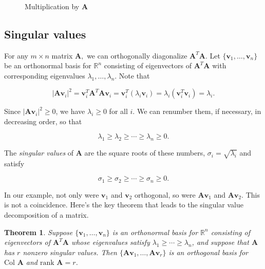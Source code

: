 \documentclass[
]{book}
\newtheorem{theorem}{Theorem}[chapter]
\theoremstyle{definition}
\theoremstyle{definition}
\theoremstyle{definition}
\theoremstyle{definition}
\theoremstyle{remark}
\begin{document}
\begin{figure}
{}

\caption{Multiplication by $\mathbf{A}$}\label{fig:svd1}
\end{figure}

\subsection*{Singular values}\label{singular-values}

For any \(m\times n\) matrix \(\mathbf{A},\) we can orthogonally diagonalize \(\mathbf{A}^T\mathbf{A}\). Let \(\{\mathbf{v}_1,\dots,\mathbf{v}_n\}\) be an orthonormal basis for \(\mathbb{R}^n\) consisting of eigenvectors of \(\mathbf{A}^T\mathbf{A}\) with corresponding eigenvalues \(\lambda_1,\dots, \lambda_n\). Note that

\[|\mathbf{A}\mathbf{v}_i|^2=\mathbf{v}_i^T\mathbf{A}^T\mathbf{A}\mathbf{v}_i=\mathbf{v}_i^T(\lambda_i\mathbf{v}_i)=\lambda_i(\mathbf{v}_i^T\mathbf{v}_i)=\lambda_i.\]

Since \(|\mathbf{A}\mathbf{v}_i|^2\geq 0\), we have \(\lambda_i\geq 0\) for all \(i\). We can renumber them, if necessary, in decreasing order, so that

\[\lambda_1\geq \lambda_2\geq \cdots \geq \lambda_n\geq 0.\]

The \emph{singular values} of \(\mathbf{A}\) are the square roots of these numbers, \(\sigma_i=\sqrt{\lambda_i}\) and satisfy

\[\sigma_1\geq \sigma_2\geq \cdots \geq \sigma_n\geq 0.\]

In our example, not only were \(\mathbf{v}_1\) and \(\mathbf{v}_2\) orthogonal, so were \(\mathbf{A}\mathbf{v}_1\) and \(\mathbf{A}\mathbf{v}_2\). This is not a coincidence. Here's the key theorem that leads to the singular value decomposition of a matrix\autocite{LLM}.

\begin{theorembox}

\begin{theorem}
Suppose \(\{\mathbf{v}_1,\dots,\mathbf{v}_n\}\) is an orthonormal basis for \(\mathbb{R}^n\) consisting of eigenvectors of \(\mathbf{A}^T\mathbf{A}\) whose eigenvalues satisfy \(\lambda_1\geq \cdots \geq \lambda_n\), and suppose that \(\mathbf{A}\) has \(r\) nonzero singular values. Then \(\{\mathbf{A}\mathbf{v}_1,\dots,\mathbf{A}\mathbf{v}_r\}\) is an orthogonal basis for \(\text{Col }\mathbf{A}\) and \(\text{rank }\mathbf{A}=r\).
\end{theorem}

\end{theorembox}
\end{document}
